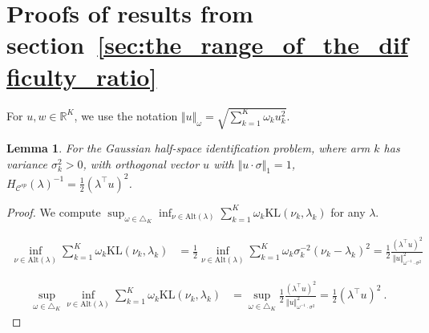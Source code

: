 \documentclass{article}
\newcommand{\KL}{\mathrm{KL}}
\newcommand{\alt}{\mathrm{Alt}}
\newtheorem{lemma}{Lemma}
\begin{document}


\section{Proofs of results from section~\ref{sec:the_range_of_the_difficulty_ratio}}
\label{sec:proofs_of_results_from_section_sec:the_range_of_the_difficulty_ratio}

For $u, w \in \mathbb{R}^K$, we use the notation $\Vert u \Vert_{\omega} = \sqrt{\sum_{k=1}^K \omega_k u_k^2}$.

\begin{lemma}
For the Gaussian half-space identification problem, where arm $k$ has variance $\sigma_k^2 > 0$, with orthogonal vector $u$ with $\Vert u \cdot \sigma \Vert_1 = 1$, $H_{\mathcal C^{sp}}(\lambda)^{-1} = \frac{1}{2}(\lambda^\top u)^2$.
\end{lemma}

\begin{proof}
We compute $\sup_{\omega \in \triangle_K} \inf_{\nu \in \alt(\lambda)} \sum_{k=1}^K \omega_k \KL(\nu_k, \lambda_k)$ for any $\lambda$.

\begin{align*}
\inf_{\nu \in \alt(\lambda)} \sum_{k=1}^K \omega_k \KL(\nu_k, \lambda_k)
&= \frac{1}{2}\inf_{\nu \in \alt(\lambda)} \sum_{k=1}^K \omega_k \sigma_k^{-2} (\nu_k - \lambda_k)^2
= \frac{1}{2} \frac{(\lambda^\top u)^2}{\Vert u \Vert_{\omega^{-1} \cdot \sigma^{2}}^2}
\end{align*}

\begin{align*}
\sup_{\omega \in \triangle_K} \inf_{\nu \in \alt(\lambda)} \sum_{k=1}^K \omega_k \KL(\nu_k, \lambda_k)
&= \sup_{\omega \in \triangle_K} \frac{1}{2} \frac{(\lambda^\top u)^2}{\Vert u \Vert_{\omega^{-1} \cdot \sigma^{2}}^2}
= \frac{1}{2} (\lambda^\top u)^2
\: .
\end{align*}
\end{proof}
\end{document}
